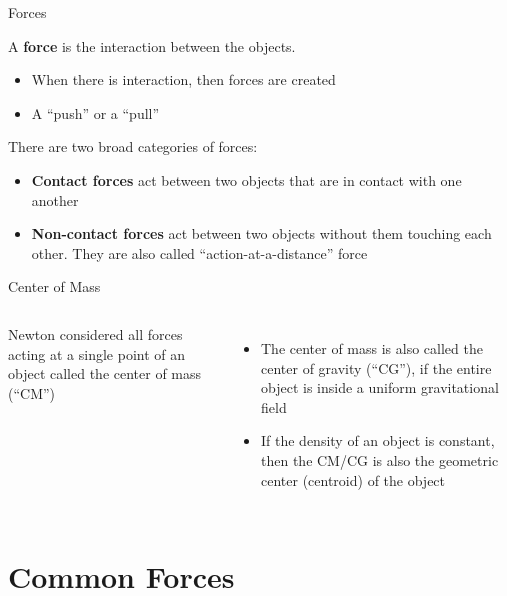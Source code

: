 \documentclass[12pt,compress,aspectratio=169]{beamer}
\begin{document}
\begin{frame}{Forces}

  A \textbf{force} is the interaction between the objects.
  \begin{itemize}
  \item When there is interaction, then forces are created
  \item A ``push'' or a ``pull''
  \end{itemize}

  There are two broad categories of forces:
  \begin{itemize}
  \item\textbf{Contact forces} act between two objects that are in contact
    with one another
  \item\textbf{Non-contact forces} act between two objects without them
    touching each other. They are also called ``action-at-a-distance'' force
  \end{itemize}
\end{frame}



\begin{frame}{Center of Mass}
  \vspace{.2in}
  \begin{columns}
    Newton considered all forces acting at a single point of an object called
    the center of mass (``CM'')
    \begin{itemize}
    \item The center of mass is also called the center of gravity (``CG''), if
      the entire object is inside a uniform gravitational field
    \item If the density of an object is constant, then the CM/CG is also the
      geometric center (centroid) of the object
    \end{itemize}

  \end{columns}
\end{frame}

\section{Common Forces}
\end{document}
